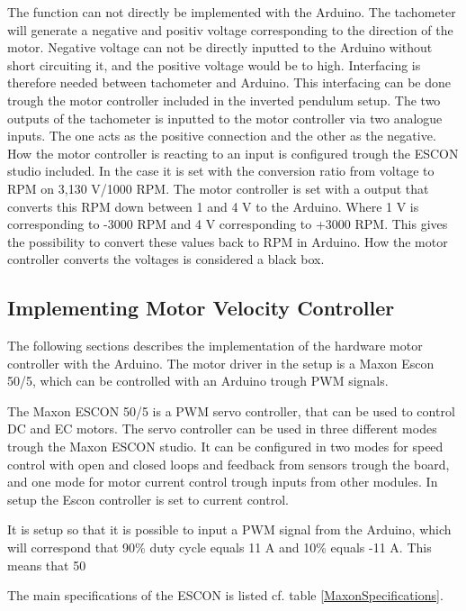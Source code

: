 The function can not directly be implemented with the Arduino. The tachometer will generate a negative and positiv voltage corresponding to the direction of the motor. Negative voltage can not be directly inputted to the Arduino without short circuiting it, and the positive voltage would be to high. Interfacing is therefore needed between tachometer and Arduino.
This interfacing can be done trough the motor controller included in the inverted pendulum setup. The two outputs of the tachometer is inputted to the motor controller via two analogue inputs. The one acts as the positive connection and the other as the negative. How the motor controller is reacting to an input is configured trough the ESCON studio included. In the case it is set with the conversion ratio from voltage to RPM on 3,130 V/1000 RPM. The motor controller is set with a output that converts this RPM down between 1 and 4 V to the Arduino. Where 1 V is corresponding to -3000 RPM and 4 V corresponding to +3000 RPM. This gives the possibility to convert these values back to RPM in Arduino. How the motor controller converts the voltages is considered a black box.



\subsection{Implementing Motor Velocity Controller}
The following sections describes the implementation of the hardware motor controller with the Arduino. The motor driver in the setup is a Maxon Escon 50/5, which can be controlled with an Arduino trough PWM signals. 

The Maxon ESCON 50/5 is a PWM servo controller, that can be used to control DC and EC motors. The servo controller can be used in three different modes trough the Maxon ESCON studio. It can be configured in two modes for speed control with open and closed loops and feedback from sensors trough the board, and one mode for motor current control trough inputs from other modules. In setup the Escon controller is set to current control.

It is setup so that it is possible to input a PWM signal from the Arduino, which will correspond that 90\% duty cycle equals 11 A and 10\% equals -11 A. This means that 50

The main specifications of the ESCON is listed cf. table \ref{MaxonSpecifications}.

